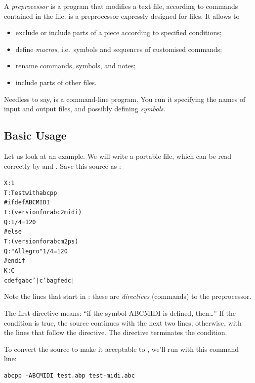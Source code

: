 \documentclass[a4paper,fullpage,12pt]{book}
\begin{document}
\lettrine{A}{} \emph{preprocessor} is a program that modifies a text
file, according to commands contained in the file. \abcpp{} is a
preprocessor expressly designed for \ABC{} files. It allows to

\begin{itemize}
  
  \item exclude or include parts of a piece according to specified
  conditions;
  
  \item define \emph{macros}, i.e.\ symbols and sequences of customised
  commands;
  
  \item rename commands, symbols, and notes;
  
  \item include parts of other files.
  
\end{itemize}

Needless to say, \abcpp{} is a command-line program. You run it specifying
the names of input and output files, and possibly defining \emph{symbols}.


\subsection{Basic Usage}

Let us look at an example. We will write a portable \ABC{} file, which
can be read correctly by \abcm{} and \abcmid. Save this source as
:

\begin{alltt}
X: 1
T: Test with abcpp
#ifdef ABCMIDI
T: (version for abc2midi)
Q: 1/4 = 120
#else
T: (version for abcm2ps)
Q: "Allegro" 1/4 = 120
#endif
K: C
cdef gabc'|c'bag fedc|
\end{alltt}

Note the lines that start in \car{\#}: these are \emph{directives}
(commands) to the preprocessor.

The first directive means: ``if the symbol ABCMIDI is defined,
then{\ldots}'' If the condition is true, the source continues with the next
two lines; otherwise, with the lines that follow the  directive.
The  directive terminates the condition.

To convert the source to make it acceptable to \abcmid, we'll run \abcpp{}
with this command line:

\begin{verbatim}
abcpp -ABCMIDI test.abp test-midi.abc
\end{verbatim}
\end{document}
